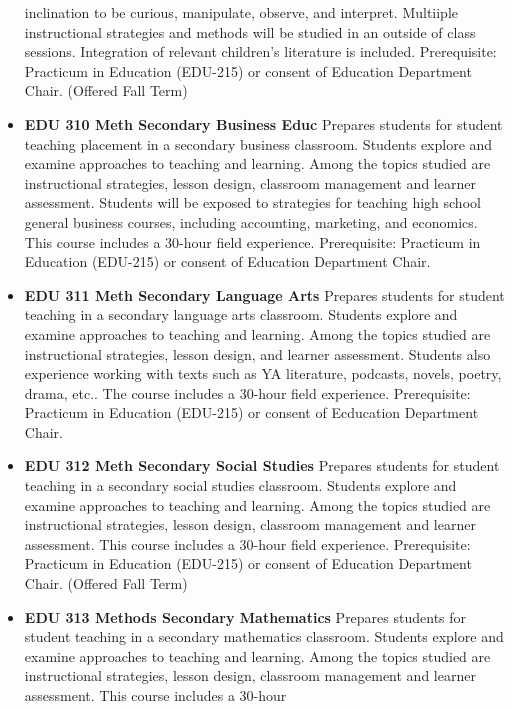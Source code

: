 \documentclass[
  letterpaper,
]{scrbook}
\begin{document}
\begin{itemize}
  inclination to be curious, manipulate, observe, and interpret.
  Multiiple instructional strategies and methods will be studied in an
  outside of class sessions. Integration of relevant children's
  literature is included. Prerequisite: Practicum in Education (EDU-215)
  or consent of Education Department Chair. (Offered Fall Term)\\
\item
  \textbf{EDU 310 Meth Secondary Business Educ} Prepares students for
  student teaching placement in a secondary business classroom. Students
  explore and examine approaches to teaching and learning. Among the
  topics studied are instructional strategies, lesson design, classroom
  management and learner assessment. Students will be exposed to
  strategies for teaching high school general business courses,
  including accounting, marketing, and economics. This course includes a
  30-hour field experience. Prerequisite: Practicum in Education
  (EDU-215) or consent of Education Department Chair.\\
\item
  \textbf{EDU 311 Meth Secondary Language Arts} Prepares students for
  student teaching in a secondary language arts classroom. Students
  explore and examine approaches to teaching and learning. Among the
  topics studied are instructional strategies, lesson design, and
  learner assessment. Students also experience working with texts such
  as YA literature, podcasts, novels, poetry, drama, etc.. The course
  includes a 30-hour field experience. Prerequisite: Practicum in
  Education (EDU-215) or consent of Ecducation Department Chair.\\
\item
  \textbf{EDU 312 Meth Secondary Social Studies} Prepares students for
  student teaching in a secondary social studies classroom. Students
  explore and examine approaches to teaching and learning. Among the
  topics studied are instructional strategies, lesson design, classroom
  management and learner assessment. This course includes a 30-hour
  field experience. Prerequisite: Practicum in Education (EDU-215) or
  consent of Education Department Chair. (Offered Fall Term)\\
\item
  \textbf{EDU 313 Methods Secondary Mathematics} Prepares students for
  student teaching in a secondary mathematics classroom. Students
  explore and examine approaches to teaching and learning. Among the
  topics studied are instructional strategies, lesson design, classroom
  management and learner assessment. This course includes a 30-hour

\end{itemize}
\end{document}
